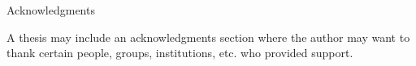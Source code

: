 \thispagestyle{empty}

\vspace*{2cm}

\begin{center}
{ Acknowledgments}
\end{center}

\vspace{1cm}

A thesis may include an acknowledgments section where the author may want to thank certain people, groups, institutions, etc. who provided support.


\cleardoublepage{}
